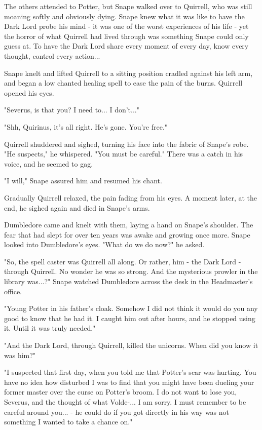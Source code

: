 The others attended to Potter, but Snape walked over to Quirrell, who was still moaning softly and obviously dying. Snape knew what it was like to have the Dark Lord probe his mind - it was one of the worst experiences of his life - yet the horror of what Quirrell had lived through was something Snape could only guess at. To have the Dark Lord share every moment of every day, know every thought, control every action...

Snape knelt and lifted Quirrell to a sitting position cradled against his left arm, and began a low chanted healing spell to ease the pain of the burns. Quirrell opened his eyes.

"Severus, is that you? I need to... I don't..."

"Shh, Quirinus, it's all right. He's gone. You're free."

Quirrell shuddered and sighed, turning his face into the fabric of Snape's robe. "He suspects," he whispered. "You must be careful." There was a catch in his voice, and he seemed to gag.

"I will," Snape assured him and resumed his chant.

Gradually Quirrell relaxed, the pain fading from his eyes. A moment later, at the end, he sighed again and died in Snape's arms.

Dumbledore came and knelt with them, laying a hand on Snape's shoulder. The fear that had slept for over ten years was awake and growing once more. Snape looked into Dumbledore's eyes. "What do we do now?" he asked.

\sbreak

"So, the spell caster was Quirrell all along. Or rather, him - the Dark Lord - through Quirrell. No wonder he was so strong. And the mysterious prowler in the library was...?" Snape watched Dumbledore across the desk in the Headmaster's office.

"Young Potter in his father's cloak. Somehow I did not think it would do you any good to know that he had it. I caught him out after hours, and he stopped using it. Until it was truly needed."

"And the Dark Lord, through Quirrell, killed the unicorns. When did you know it was him?"

"I suspected that first day, when you told me that Potter's scar was hurting. You have no idea how disturbed I was to find that you might have been dueling your former master over the curse on Potter's broom. I do not want to lose you, Severus, and the thought of what Volde-... I am sorry. I must remember to be careful around you... - he could do if you got directly in his way was not something I wanted to take a chance on."

